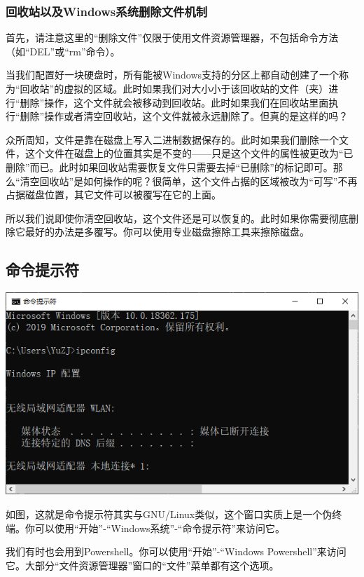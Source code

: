 \subsubsection{回收站以及Windows系统删除文件机制}
首先，请注意这里的“删除文件”仅限于使用文件资源管理器，不包括命令方法（如“DEL”或“rm”命令）。\par
当我们配置好一块硬盘时，所有能被Windows支持的分区上都自动创建了一个称为“回收站”的虚拟的区域。此时如果我们对大小小于该回收站的文件（夹）进行“删除”操作，这个文件就会被移动到回收站。此时如果我们在回收站里面执行“删除”操作或者清空回收站，这个文件就被永远删除了。但真的是这样的吗？\par
众所周知，文件是靠在磁盘上写入二进制数据保存的。此时如果我们删除一个文件，这个文件在磁盘上的位置其实是不变的——只是这个文件的属性被更改为“已删除”而已。此时如果回收站需要恢复文件只需要去掉“已删除”的标记即可。那么“清空回收站”是如何操作的呢？很简单，这个文件占据的区域被改为“可写”不再占据磁盘位置，其它文件可以被覆写在它的上面。\par
所以我们说即使你清空回收站，这个文件还是可以恢复的。此时如果你需要彻底删除它最好的办法是多覆写。你可以使用专业磁盘擦除工具来擦除磁盘。
\subsection{命令提示符}
\begin{center}
	\includegraphics[scale=0.4]{pic/cmd}
\end{center} \par
如图，这就是命令提示符其实与GNU/Linux类似，这个窗口实质上是一个伪终端。你可以使用“开始”-“Windows系统”-“命令提示符”来访问它。\par
我们有时也会用到Powershell。你可以使用“开始”-“Windows Powershell”来访问它。大部分“文件资源管理器”窗口的“文件”菜单都有这个选项。
